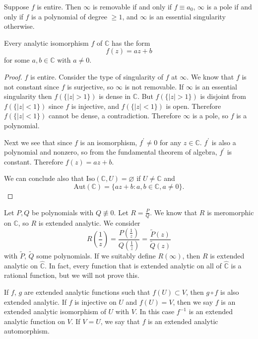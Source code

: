 Suppose $f$ is entire. Then $\infty$ is removable if and only if
$f \equiv a_0$, $\infty$ is a pole if and only if $f$ is a polynomial
of degree $\geq 1$, and $\infty$ is an essential singularity
otherwise.

\begin{lemma}
Every analytic isomorphism $f$ of $\mathbb{C}$ has the form
$$
f(z) = a z + b
$$
for some $a, b \in \mathbb{C}$ with $a \neq 0$.
\end{lemma}

\begin{proof}
$f$ is entire. Consider the type of singularity of $f$ at $\infty$.
We know that $f$ is not constant since $f$ is surjective,
so $\infty$ is not removable. If $\infty$ is an essential singularity
then $f(\{ |z| > 1 \})$ is dense in $\mathbb{C}$. But
$f(\{ |z| > 1 \})$ is disjoint from $f(\{ |z| < 1 \})$ since $f$ is
injective, and $f(\{ |z| < 1 \})$ is open. Therefore $f(\{|z| < 1\})$
cannot be dense, a contradiction. Therefore $\infty$ is a pole, so
$f$ is a polynomial.

Next we see that since $f$ is an isomorphism, $f^\prime \neq 0$ for
any $z \in \mathbb{C}$. $f^\prime$ is also a polynomial and nonzero,
so from the fundamental theorem of algebra, $f^\prime$ is constant.
Therefore $f(z) = az + b$.

We can conclude also that
$\mathrm{Iso}(\mathbb{C}, U) = \varnothing$ if $U \neq \mathbb{C}$
and
$$
  \mathrm{Aut}(\mathbb{C})
= \{ az + b : a, b \in \mathbb{C}, a \neq 0 \}.
$$
\end{proof}

Let $P, Q$ be polynomials with $Q \nequiv 0$. Let
$R = \frac{P}{Q}$. We know that $R$ is meromorphic on $\mathbb{C}$,
so $R$ is extended analytic. We consider
$$
  R\left(\frac{1}{z}\right)
= \frac{P\left(\frac{1}{z}\right)}
       {Q\left(\frac{1}{z}\right)}
= \frac{\tilde{P}(z)}
       {\tilde{Q}(z)}
$$
with $\tilde{P}$, $\tilde{Q}$ some polynomials. If we suitably
define $R(\infty)$, then $R$ is extended analytic on
$\hat{\mathbb{C}}$. In fact, every function that is extended
analytic on all of $\hat{\mathbb{C}}$ is a rational function,
but we will not prove this.

If $f$, $g$ are extended analytic functions such that
$f(U) \subset V$, then $g \circ f$ is also extended analytic.
If $f$ is injective on $U$ and $f(U) = V$, then we say
$f$ is an extended analytic isomorphism of $U$ with $V$.
In this case $f^{-1}$ is an extended analytic function on $V$.
If $V = U$, we say that $f$ is an extended analytic automorphism.

